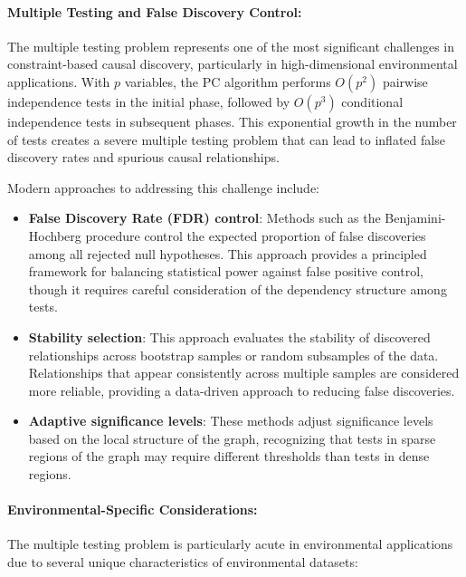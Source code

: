 \paragraph{Multiple Testing and False Discovery Control:}

The multiple testing problem represents one of the most significant challenges in constraint-based causal discovery, particularly in high-dimensional environmental applications. With $p$ variables, the PC algorithm performs $O(p^2)$ pairwise independence tests in the initial phase, followed by $O(p^3)$ conditional independence tests in subsequent phases. This exponential growth in the number of tests creates a severe multiple testing problem that can lead to inflated false discovery rates and spurious causal relationships.

Modern approaches to addressing this challenge include:

\begin{itemize}
	\item \textbf{False Discovery Rate (FDR) control}: Methods such as the Benjamini-Hochberg procedure control the expected proportion of false discoveries among all rejected null hypotheses. This approach provides a principled framework for balancing statistical power against false positive control, though it requires careful consideration of the dependency structure among tests.

	\item \textbf{Stability selection}: This approach evaluates the stability of discovered relationships across bootstrap samples or random subsamples of the data. Relationships that appear consistently across multiple samples are considered more reliable, providing a data-driven approach to reducing false discoveries.

	\item \textbf{Adaptive significance levels}: These methods adjust significance levels based on the local structure of the graph, recognizing that tests in sparse regions of the graph may require different thresholds than tests in dense regions.
\end{itemize}

\paragraph{Environmental-Specific Considerations:}

The multiple testing problem is particularly acute in environmental applications due to several unique characteristics of environmental datasets:

